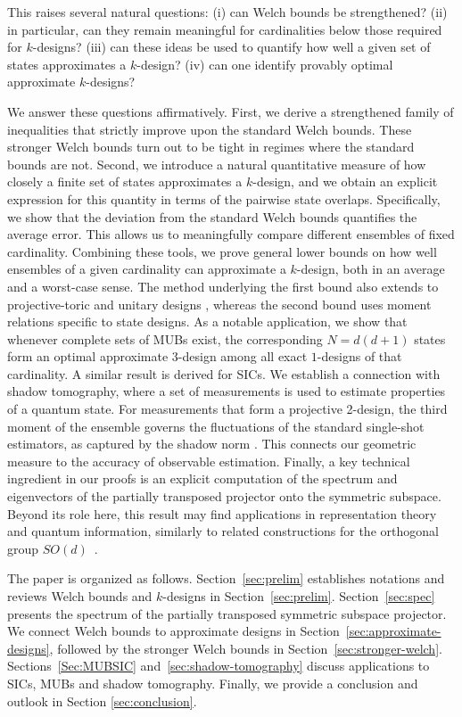 \documentclass[aps,twocolumn,pra,superscriptaddress,nofootinbib]{revtex4-2}
\begin{document}
This raises several natural questions:  
(i) can Welch bounds be strengthened{? (ii) in particular, can they} remain meaningful for cardinalities below those required for $k$-designs?
{(iii)} can these ideas be used to quantify how well a given set of states approximates a $k$-design? {(iv)} can one identify provably optimal approximate $k$-designs?


We answer these questions affirmatively. 
First, we derive a strengthened family of inequalities that strictly improve upon the standard Welch bounds. These {stronger Welch} bounds turn out to be tight in regimes where the standard bounds are not. Second, we introduce a natural quantitative measure of how closely a finite {set of states} approximates a $k$-design, and we obtain an explicit expression for this quantity in terms of the pairwise state overlaps. Specifically, we show that the deviation from the standard Welch bounds quantifies the average error. This allows us to meaningfully compare different ensembles of fixed cardinality.
Combining these tools, we prove general lower bounds on how well ensembles of a given cardinality can approximate a $k$-design, both in an average and a worst-case sense. 
{The method underlying the first bound also extends to projective-toric and unitary designs \cite{Mele2024}, whereas the second bound uses moment relations specific to state designs.}
As a notable application, we show that whenever complete sets of MUBs exist, the corresponding $N=d(d+1)$ states form an optimal approximate $3$-design among all {exact $1$-designs} of that cardinality. A similar result is derived for SICs. {We establish a connection with shadow tomography, where a set of measurements is used to estimate properties of a quantum state. For measurements that form a projective 2-design, the third moment of the ensemble governs the fluctuations of the standard single-shot estimators, as captured by the shadow norm \cite{Huang2020Predicting}. This connects our geometric measure to the accuracy of observable estimation.} Finally, a key technical ingredient in our proofs is an explicit computation of the spectrum and eigenvectors of the partially transposed projector onto the symmetric subspace. Beyond its role here, this result may find applications in representation theory and quantum information, similarly to related constructions for the orthogonal group $SO(d)$~\cite{Nemoz2025}.

{The paper is organized as follows. Section~\ref{sec:prelim} establishes notations and reviews Welch bounds and $k$-designs in Section~\ref{sec:prelim}.  Section~\ref{sec:spec} presents the spectrum of the partially transposed symmetric subspace projector. We connect Welch bounds to approximate designs in Section~\ref{sec:approximate-designs}, followed by the stronger Welch bounds in Section~\ref{sec:stronger-welch}. Sections~\ref{Sec:MUBSIC} and~\ref{sec:shadow-tomography} discuss applications to SICs, MUBs and shadow tomography. Finally, we provide a conclusion and outlook in Section \ref{sec:conclusion}.}
\end{document}
